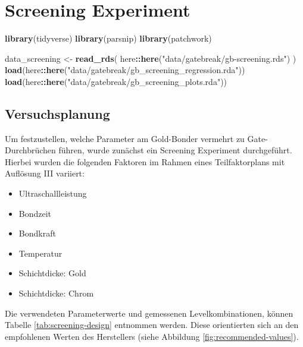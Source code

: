 \documentclass[
  paper=a4,
  ,captions=tableheading
]{scrartcl}
\newenvironment{Shaded}{\begin{snugshade}}{\end{snugshade}}
\newcommand{\KeywordTok}[1]{\textcolor[rgb]{0.13,0.29,0.53}{\textbf{#1}}}
\newcommand{\NormalTok}[1]{#1}
\newcommand{\OperatorTok}[1]{\textcolor[rgb]{0.81,0.36,0.00}{\textbf{#1}}}
\newcommand{\StringTok}[1]{\textcolor[rgb]{0.31,0.60,0.02}{#1}}
\providecommand{\tightlist}{%
  \setlength{\itemsep}{0pt}\setlength{\parskip}{0pt}}
\begin{document}
\hypertarget{gb-screening}{%
\section{Screening Experiment}\label{gb-screening}}

\begin{Shaded}
\begin{Highlighting}[]
\KeywordTok{library}\NormalTok{(tidyverse)}
\KeywordTok{library}\NormalTok{(parsnip)}
\KeywordTok{library}\NormalTok{(patchwork)}
\end{Highlighting}
\end{Shaded}

\begin{Shaded}
\begin{Highlighting}[]
\NormalTok{data_screening <-}\StringTok{ }\KeywordTok{read_rds}\NormalTok{(}
\NormalTok{  here}\OperatorTok{::}\KeywordTok{here}\NormalTok{(}\StringTok{"data/gatebreak/gb-screening.rds"}\NormalTok{)}
\NormalTok{)}
\KeywordTok{load}\NormalTok{(here}\OperatorTok{::}\KeywordTok{here}\NormalTok{(}\StringTok{"data/gatebreak/gb_screening_regression.rda"}\NormalTok{))}
\KeywordTok{load}\NormalTok{(here}\OperatorTok{::}\KeywordTok{here}\NormalTok{(}\StringTok{"data/gatebreak/gb_screening_plots.rda"}\NormalTok{))}
\end{Highlighting}
\end{Shaded}

\hypertarget{gb-screening-doe}{%
\subsection{Versuchsplanung}\label{gb-screening-doe}}

Um festzustellen, welche Parameter am Gold-Bonder vermehrt zu Gate-Durchbrüchen führen, wurde zunächst ein Screening Experiment durchgeführt. Hierbei wurden die folgenden Faktoren im Rahmen eines Teilfaktorplans mit Auflösung III variiert:

\begin{itemize}
\tightlist
\item
  Ultraschallleistung
\item
  Bondzeit
\item
  Bondkraft
\item
  Temperatur
\item
  Schichtdicke: Gold
\item
  Schichtdicke: Chrom
\end{itemize}

Die verwendeten Parameterwerte und gemessenen Levelkombinationen, können Tabelle \ref{tab:screening-design} entnommen werden. Diese orientierten sich an den empfohlenen Werten des Herstellers (siehe Abbildung \ref{fig:recommended-values}).
\end{document}
